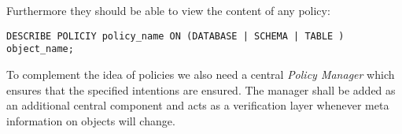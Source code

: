 Furthermore they should be able to view the content of any policy: 
\begin{verbatim}
DESCRIBE POLICIY policy_name ON (DATABASE | SCHEMA | TABLE ) object_name; 
\end{verbatim}

To complement the idea of policies we also need a central \emph{Policy Manager} which ensures that the specified intentions are ensured.
The manager shall be added as an additional central component and acts as a verification layer whenever meta information on objects will change.


